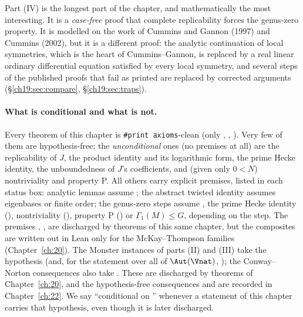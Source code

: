 Part (IV) is the longest part of the chapter, and mathematically the most interesting.  It is a \emph{case-free} proof
that complete replicability forces the genus-zero property.  It is modelled on the work of Cummins and Gannon (1997)
and Cummins (2002), but it is a different proof: the analytic continuation of local symmetries, which is the heart of
Cummins--Gannon, is replaced by a real linear ordinary differential equation satisfied by every local symmetry, and
several steps of the published proofs that fail as printed are replaced by corrected arguments (\S\ref{ch19:sec:compare},
\S\ref{ch19:sec:traps}).

\paragraph{What is conditional and what is not.}  Every theorem of this chapter is \texttt{\#print axioms}-clean
(only , , ).  Very few of them are hypothesis-free; the
\emph{unconditional} ones (no premises at all) are the replicability of $J$, the product identity 
and its logarithmic form, the prime Hecke identity, the unboundedness of $J$'s coefficients, and (given only $0<N$)
nontriviality and property P.  All others carry explicit premises, listed in each status box: analytic lemmas assume
; the abstract twisted identity assumes eigenbases or finite order; the genus-zero steps assume
, the prime Hecke identity (), nontriviality (), property P () or
$\Gamma_1(M)\le G$, depending on the step.  The premises , ,  are discharged by theorems of this
same chapter, but the composites are written out in Lean only for the McKay--Thompson families (Chapter~\ref{ch:20}).
The Monster instances of parts (II) and (III)
take the hypothesis  (and, for the statement over all of
$\Aut(\Vnat)$, ); the Conway--Norton consequences also take
.  These are discharged by theorems of
Chapter~\ref{ch:20}, and the hypothesis-free consequences  and
 are recorded in Chapter~\ref{ch:22}.  We say ``conditional on '' whenever
a statement of this chapter carries that hypothesis, even though it is later discharged.

